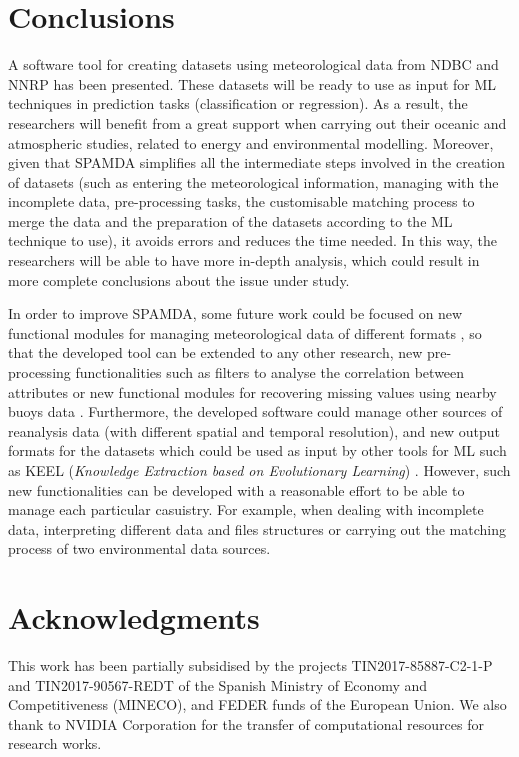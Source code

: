 \documentclass[review]{elsarticle}
\begin{document}
		
	\section{Conclusions}\label{sec:Conclusions}

		A software tool for creating datasets using meteorological data from NDBC and NNRP has been presented. These datasets will be ready to use as input for ML techniques in prediction tasks (classification or regression). As a result, the researchers will benefit from a great support when carrying out their oceanic and atmospheric studies, related to energy and environmental modelling. Moreover, given that SPAMDA simplifies all the intermediate steps involved in the creation of datasets (such as entering the meteorological information, managing with the incomplete data, pre-processing tasks, the customisable matching process to merge the data and the preparation of the datasets according to the ML technique to use), it avoids errors and reduces the time needed. In this way, the researchers will be able to have more in-depth analysis, which could result in more complete conclusions about the issue under study.
		
		In order to improve SPAMDA, some future work could be focused on new functional modules for managing meteorological data of different formats \cite{NOAA_3}, so that the developed tool can be extended to any other research, new pre-processing functionalities such as filters to analyse the correlation between attributes or new functional modules for recovering missing values using nearby buoys data \cite{DuranRosal2016}. Furthermore, the developed software could manage other sources of reanalysis data (with different spatial and temporal resolution), and new output formats for the datasets which could be used as input by other tools for ML such as KEEL (\textit{Knowledge Extraction based on Evolutionary Learning}) \cite{AlcalFdez2009KEELAS}. However, such new functionalities can be developed with a reasonable effort to be able to manage each particular casuistry. For example, when dealing with incomplete data, interpreting different data and files structures or carrying out the matching process of two environmental data sources.
		
		
	\section*{Acknowledgments}
	
		This work has been partially subsidised by the projects TIN2017-85887-C2-1-P and TIN2017-90567-REDT of the Spanish Ministry of Economy and Competitiveness (MI\-NE\-CO), and FEDER funds of the European Union. We also thank to NVIDIA Corporation for the transfer of computational resources for research works.
		
\end{document}
